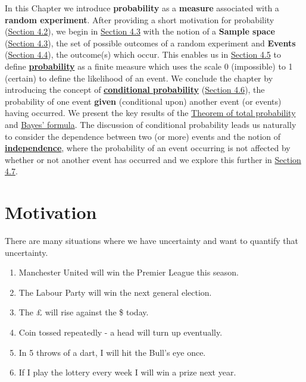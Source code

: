\documentclass[
]{book}
\providecommand{\tightlist}{%
  \setlength{\itemsep}{0pt}\setlength{\parskip}{0pt}}
\begin{document}
In this Chapter we introduce \textbf{probability} as a \textbf{measure} associated with a \textbf{random experiment}. After providing a short motivation for probability (\protect\hyperlink{prob:motivation}{Section 4.2}), we begin in \protect\hyperlink{prob:sample_space}{Section 4.3} with the notion of a \textbf{Sample space} (\protect\hyperlink{prob:sample_space}{Section 4.3}), the set of possible outcomes of a random experiment and \textbf{Events} (\protect\hyperlink{prob:events}{Section 4.4}), the outcome(s) which occur. This enables us in \protect\hyperlink{prob:defn}{Section 4.5} to define \protect\hyperlink{prob:def:prob}{\textbf{probability}} as a finite measure which uses the scale 0 (impossible) to 1 (certain) to define the likelihood of an event. We conclude the chapter by introducing the concept of \protect\hyperlink{prob:def:cond}{\textbf{conditional probability}} (\protect\hyperlink{prob:Conditional_Probability}{Section 4.6}), the probability of one event \textbf{given} (conditional upon) another event (or events) having occurred. We present the key results of the \protect\hyperlink{prob:thm:totalprob}{Theorem of total probability} and \protect\hyperlink{prob:thm:bayes}{Bayes' formula}.
The discussion of conditional probability leads us naturally to consider the dependence between two (or more) events and the notion of \protect\hyperlink{prob:def:independence}{\textbf{independence}}, where the probability of an event occurring is not affected by whether or not another event has occurred and we explore this further in \protect\hyperlink{prob:mutual}{Section 4.7}.

\hypertarget{prob:motivation}{%
\section{Motivation}\label{prob:motivation}}

There are many situations where we have uncertainty and want to quantify that uncertainty.

\begin{enumerate}
\def\labelenumi{(\alph{enumi})}
\tightlist
\item
  Manchester United will win the Premier League this season.\\
\item
  The Labour Party will win the next general election.\\
\item
  The £ will rise against the \$ today.\\
\item
  Coin tossed repeatedly - a head will turn up eventually.\\
\item
  In 5 throws of a dart, I will hit the Bull's eye once.\\
\item
  If I play the lottery every week I will win a prize next year.
\end{enumerate}
\end{document}
